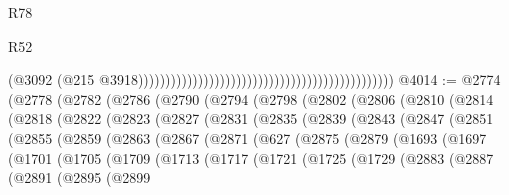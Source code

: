 \begin{lexlean}{R78}
\begin{lexlean}{R52}
\begin{coremodule}
{{{{{{{{{{{{{{{{{{{{{{{{{{{{{{{{{{{{{{{{{{{{{{{{{{{{{{{{{{{{{{{{{{{{{{{{{{{{{{{{{{{{{{{{{{{{{{{{{{{{{{{{{{{{{{{{{{{{{{{{{{{{{{{{{{{{{{{{{{{{{{{{{{{{{{{{{{{{{{{{{{{{{{{{{{{{{{{{{{{{{{{{{{{{{{{{{{{{{{                                                                                              (@3092
                                                                                                (@215
                                                                                                  @3918)))))))))))))))))))))))))))))))))))))))))))))))
@4014 := @2774
    (@2778
      (@2782
        (@2786
          (@2790
            (@2794
              (@2798
                (@2802
                  (@2806
                    (@2810
                      (@2814
                        (@2818
                          (@2822
                            (@2823
                              (@2827
                                (@2831
                                  (@2835
                                    (@2839
                                      (@2843
                                        (@2847
                                          (@2851
                                            (@2855
                                              (@2859
                                                (@2863
                                                  (@2867
                                                    (@2871
                                                      (@627
                                                        (@2875
                                                          (@2879
                                                            (@1693
                                                              (@1697
                                                                (@1701
                                                                  (@1705
                                                                    (@1709
                                                                      (@1713
                                                                        (@1717
                                                                          (@1721
                                                                            (@1725
                                                                              (@1729
                                                                                (@2883
                                                                                  (@2887
                                                                                    (@2891
                                                                                      (@2895
                                                                                        (@2899
}}}}}}}}}}}}}}}}}}}}}}}}}}}}}}}}}}}}}}}}}}}}}}}}}}}}}}}}}}}}}}}}}}}}}}}}}}}}}}}}}}}}}}}}}}}}}}}}}}}}}}}}}}}}}}}}}}}}}}}}}}}}}}}}}}}}}}}}}}}}}}}}}}}}}}}}}}}}}}}}}}}}}}}}}}}}}}}}}}}}}}}}}}}}}}}}}}}}}}
\end{coremodule}
\end{lexlean}
\end{lexlean}
